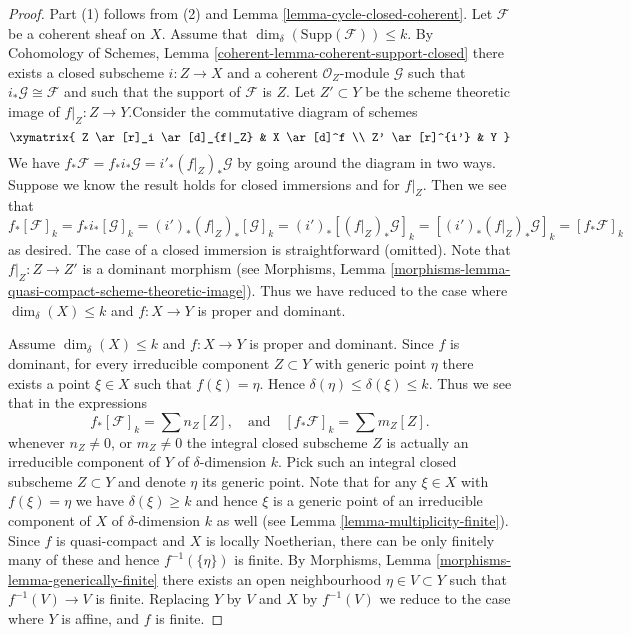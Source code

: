 \begin{proof}
Part (1) follows from (2) and Lemma \ref{lemma-cycle-closed-coherent}.
Let $\mathcal{F}$ be a coherent sheaf on $X$.
Assume that $\dim_\delta(\text{Supp}(\mathcal{F})) \leq k$.
By Cohomology of Schemes, Lemma \ref{coherent-lemma-coherent-support-closed}
there exists a closed subscheme $i : Z \to X$ and a coherent
$\mathcal{O}_Z$-module $\mathcal{G}$ such that
$i_*\mathcal{G} \cong \mathcal{F}$ and such that the support
of $\mathcal{F}$ is $Z$. Let $Z' \subset Y$ be the scheme theoretic image
of $f|_Z : Z \to Y$.Consider the commutative diagram of schemes
$$
\xymatrix{
Z \ar[r]_i \ar[d]_{f|_Z} &
X \ar[d]^f \\
Z' \ar[r]^{i'} & Y
}
$$
We have $f_*\mathcal{F} = f_*i_*\mathcal{G} = i'_*(f|_Z)_*\mathcal{G}$
by going around the diagram in two ways. Suppose we know the result holds
for closed immersions and for $f|_Z$. Then we see that
$$
f_*[\mathcal{F}]_k = f_*i_*[\mathcal{G}]_k
= (i')_*(f|_Z)_*[\mathcal{G}]_k =
(i')_*[(f|_Z)_*\mathcal{G}]_k =
[(i')_*(f|_Z)_*\mathcal{G}]_k = [f_*\mathcal{F}]_k
$$
as desired. The case of a closed immersion is straightforward (omitted).
Note that $f|_Z : Z \to Z'$ is a dominant morphism (see
Morphisms, Lemma \ref{morphisms-lemma-quasi-compact-scheme-theoretic-image}).
Thus we have reduced to the case where
$\dim_\delta(X) \leq k$ and $f : X \to Y$ is proper and dominant.

\medskip\noindent
Assume $\dim_\delta(X) \leq k$ and $f : X \to Y$ is proper and dominant.
Since $f$ is dominant, for every irreducible component $Z \subset Y$
with generic point $\eta$ there exists a point $\xi \in X$ such
that $f(\xi) = \eta$. Hence $\delta(\eta) \leq \delta(\xi) \leq k$.
Thus we see that in the expressions
$$
f_*[\mathcal{F}]_k = \sum n_Z[Z],
\quad
\text{and}
\quad
[f_*\mathcal{F}]_k = \sum m_Z[Z].
$$
whenever $n_Z \not = 0$, or $m_Z \not = 0$ the integral closed
subscheme $Z$ is actually an irreducible component of $Y$ of
$\delta$-dimension $k$. Pick such an integral closed subscheme
$Z \subset Y$ and denote $\eta$ its generic point. Note that for
any $\xi \in X$ with $f(\xi) = \eta$ we have $\delta(\xi) \geq k$
and hence $\xi$ is a generic point of an irreducible component
of $X$ of $\delta$-dimension $k$ as well
(see Lemma \ref{lemma-multiplicity-finite}). Since $f$ is quasi-compact
and $X$ is locally Noetherian, there can be only finitely many of
these and hence $f^{-1}(\{\eta\})$ is finite.
By Morphisms, Lemma \ref{morphisms-lemma-generically-finite} there exists
an open neighbourhood $\eta \in V \subset Y$ such that $f^{-1}(V) \to V$
is finite. Replacing $Y$ by $V$ and $X$ by $f^{-1}(V)$ we reduce to the
case where $Y$ is affine, and $f$ is finite.


\end{proof}
